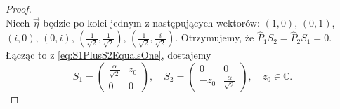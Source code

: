 {\begin{proof}
\begin{equation}
\end{equation}
Niech  $\vec{\eta}$ będzie po kolei jednym z następujących wektorów:
$(1,0)$, $(0,1)$,
$(i,0)$, $(0,i)$,
$(\frac{1}{\sqrt{2}},\frac{1}{\sqrt{2}})$,
$(\frac{1}{\sqrt{2}},\frac{i}{\sqrt{2}})$.
Otrzymujemy, że $\hat{P}_{1} S_{2} = \hat{P}_{2} S_{1} = 0$.
Łącząc to z \eqref{eq:S1PlusS2EqualsOne},
dostajemy
\begin{equation}
S_{1} = \begin{pmatrix}
    \frac{\alpha}{\sqrt{2}} & z_{0} \\ 0 & 0
\end{pmatrix}, \quad
S_{2} = \begin{pmatrix}
     0 & 0 \\ - z_{0} & \frac{\alpha}{\sqrt{2}}
\end{pmatrix}, \quad
z_{0} \in \mathbb{C}.
\end{equation}


\end{proof}}

